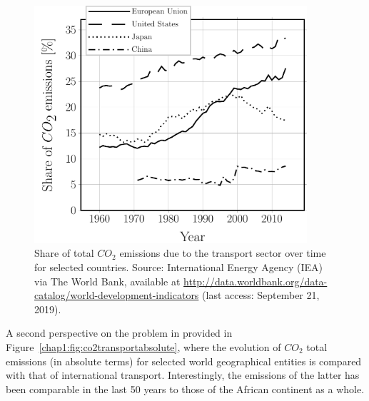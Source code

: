 \begin{description}
\begin{figure}[!h]
\includegraphics[width=0.9\textwidth]{pics/co2transportshare.pdf}
\caption{Share of total $CO_{2}$ emissions due to the transport sector over time for selected countries. Source: International Energy Agency (IEA) via The World Bank, available at \href{http://data.worldbank.org/data-catalog/world-development-indicators}{http://data.worldbank.org/data-catalog/world-development-indicators} (last access: September 21, 2019).}\label{chap1:fig:co2transportshare}
\end{figure}

A second perspective on the problem in provided in Figure~\ref{chap1:fig:co2transportabsolute}, where the evolution of $CO_{2}$ total emissions (in absolute terms) for selected world geographical entities is compared with that of international transport. Interestingly, the emissions of the latter has been comparable in the last 50 years to those of the African continent as a whole.


\end{description}
